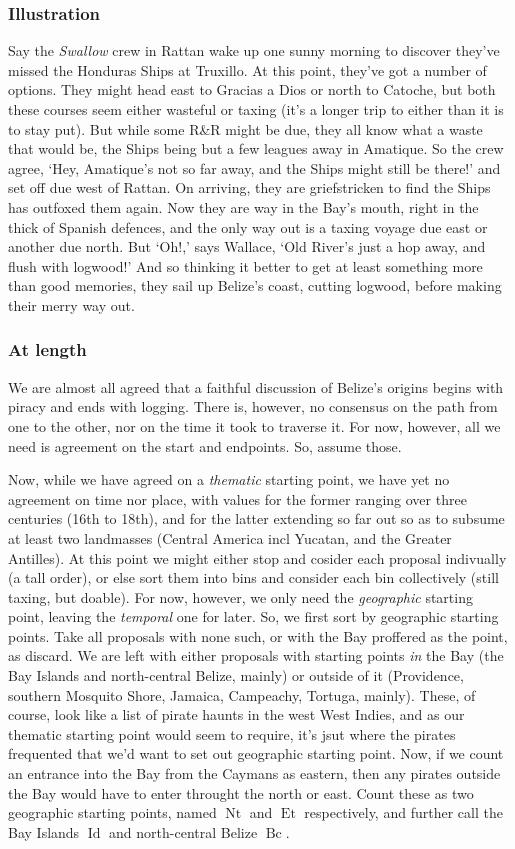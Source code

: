 \documentclass{amsart}
\newcommand{\titleit}[1]{\textit{#1}}%
\DeclareMathOperator{\id}{Id}%
\DeclareMathOperator{\bc}{Bc}%
\DeclareMathOperator{\et}{Et}%
\DeclareMathOperator{\nt}{Nt}%
\theoremstyle{definition}%
\theoremstyle{definition}%
\theoremstyle{remark}%
\begin{document}
\subsubsection{Illustration}%
Say the \titleit{Swallow} crew in Rattan wake up one sunny morning to discover they've missed the Honduras Ships at Truxillo. At this point, they've got a number of options. They might head east to Gracias a Dios or north to Catoche, but both these courses seem either wasteful or taxing (it's a longer trip to either than it is to stay put). But while some R\&R might be due, they all know what a waste that would be, the Ships being but a few leagues away in Amatique. So the crew agree, `Hey, Amatique's not so far away, and the Ships might still be there!' and set off due west of Rattan. On arriving, they are griefstricken to find the Ships has outfoxed them again. Now they are way in the Bay's mouth, right in the thick of Spanish defences, and the only way out is a taxing voyage due east or another due north. But `Oh!,' says Wallace, `Old River's just a hop away, and flush with logwood!' And so thinking it better to get at least something more than good memories, they sail up Belize's coast, cutting logwood, before making their merry way out.
\subsubsection{At length} We are almost all agreed that a faithful discussion of Belize's origins begins with piracy and ends with logging. There is, however, no consensus on the path from one to the other, nor on the time it took to traverse it. For now, however, all we need is agreement on the start and endpoints. So, assume those.

Now, while we have agreed on a \emph{thematic} starting point, we have yet no agreement on time nor place, with values for the former ranging over three centuries (16th to 18th), and for the latter extending so far out so as to subsume at least two landmasses (Central America incl Yucatan, and the Greater Antilles). At this point we might either stop and cosider each proposal indivually (a tall order), or else sort them into bins and consider each bin collectively (still taxing, but doable). For now, however, we only need the \emph{geographic} starting point, leaving the \emph{temporal} one for later. So, we first sort by geographic starting points. Take all proposals with none such, or with the Bay proffered as the point, as discard. We are left with either proposals with starting points \emph{in} the Bay (the Bay Islands and north-central Belize, mainly) or outside of it (Providence, southern Mosquito Shore, Jamaica, Campeachy, Tortuga, mainly). These, of course, look like a list of pirate haunts in the west West Indies, and as our thematic starting point would seem to require, it's jsut where the pirates frequented that we'd want to set out geographic starting point. Now, if we count an entrance into the Bay from the Caymans as eastern, then any pirates outside the Bay would have to enter throught the north or east. Count these as two geographic starting points, named \(\nt\) and \(\et\) respectively, and further call the Bay Islands \(\id\) and north-central Belize \(\bc\).
\end{document}
